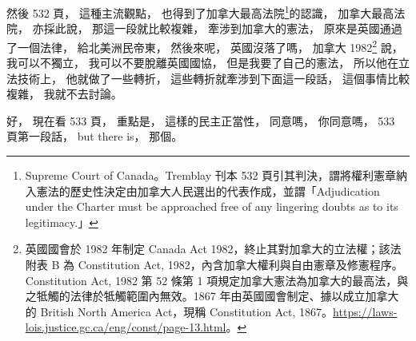 \hypertarget{w02:cue:1906}{}然後 532 頁，
\hypertarget{w02:cue:1907}{}這種主流觀點，
\hypertarget{w02:cue:1908}{}也得到了加拿大最高法院\footnote{Supreme Court of Canada。Tremblay 刊本 532 頁引其判決，謂將權利憲章納入憲法的歷史性決定由加拿大人民選出的代表作成，並謂「Adjudication under the Charter must be approached free of any lingering doubts as to its legitimacy.」}的認識，
\hypertarget{w02:cue:1909}{}加拿大最高法院，
\hypertarget{w02:cue:1910}{}亦採此說，
\hypertarget{w02:cue:1911}{}那這一段就比較複雜，
\hypertarget{w02:cue:1912}{}牽涉到加拿大的憲法，
\hypertarget{w02:cue:1913}{}原來是英國通過了一個法律，
\hypertarget{w02:cue:1914}{}給北美洲民帝東，
\hypertarget{w02:cue:1915}{}然後來呢，
\hypertarget{w02:cue:1916}{}英國沒落了嗎，
\hypertarget{w02:cue:1917}{}加拿大 1982\footnote{英國國會於 1982 年制定 Canada Act 1982，終止其對加拿大的立法權；該法附表 B 為 Constitution Act, 1982，內含加拿大權利與自由憲章及修憲程序。Constitution Act, 1982 第 52 條第 1 項規定加拿大憲法為加拿大的最高法，與之牴觸的法律於牴觸範圍內無效。1867 年由英國國會制定、據以成立加拿大的 British North America Act，現稱 Constitution Act, 1867。\url{https://laws-lois.justice.gc.ca/eng/const/page-13.html}。} 說，
\hypertarget{w02:cue:1918}{}我可以不獨立，
\hypertarget{w02:cue:1919}{}我可以不要脫離英國國協，
\hypertarget{w02:cue:1920}{}但是我要了自己的憲法，
\hypertarget{w02:cue:1921}{}所以他在立法技術上，
\hypertarget{w02:cue:1922}{}他就做了一些轉折，
\hypertarget{w02:cue:1923}{}這些轉折就牽涉到下面這一段話，
\hypertarget{w02:cue:1924}{}這個事情比較複雜，
\hypertarget{w02:cue:1925}{}我就不去討論。

\hypertarget{w02:cue:1926}{}好，
\hypertarget{w02:cue:1927}{}現在看 533 頁，
\hypertarget{w02:cue:1928}{}重點是，
\hypertarget{w02:cue:1929}{}這樣的民主正當性，
\hypertarget{w02:cue:1930}{}同意嗎，
\hypertarget{w02:cue:1931}{}你同意嗎，
\hypertarget{w02:cue:1932}{}533 頁第一段話，
\hypertarget{w02:cue:1933}{}but there is，
\hypertarget{w02:cue:1934}{}那個。

